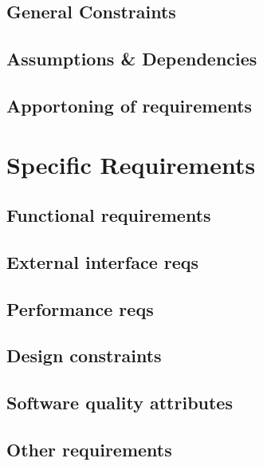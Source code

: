 \documentclass[12pt,a4paper]{report}
\begin{document}
\section{General Constraints}
\section{Assumptions \& Dependencies}
\section{Apportoning of requirements}
\chapter{Specific Requirements}
\section{Functional requirements}
\section{External interface reqs}
\section{Performance reqs}
\section{Design constraints}
\section{Software quality attributes}
\section{Other requirements}
\end{document}
